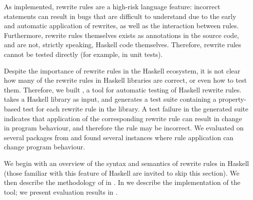 As implemented, rewrite rules are a high-risk language feature: incorrect
statements can result in bugs that are difficult to understand due to the early
and automatic application of rewrites, as well as the interaction between rules.
Furthermore, rewrite rules themselves exists as annotations in the source code,
and are not, strictly speaking, Haskell code themselves. Therefore, rewrite
rules cannot be tested directly (for example, in unit tests).

Despite the importance of rewrite rules in the Haskell ecosystem, it is not
clear how many of the rewrite rules in Haskell libraries are correct, or even
how to test them. Therefore, we built \Rulecheck, a tool for automatic testing
of Haskell rewrite rules. \Rulecheck takes a Haskell library as input, and
generates a test suite containing a property-based test for each rewrite rule in
the library. A test failure in the generated suite indicates that application of
the corresponding rewrite rule can result in change in program behaviour, and
therefore the rule may be incorrect. We evaluated \Rulecheck on several packages
from \Hackage and found several instances where rule application can change
program behaviour.

We begin with an overview of the syntax and semantics of rewrite rules in
Haskell  (those familiar with this feature of Haskell are
invited to skip this section). We then describe the methodology of \Rulecheck in
. In  we describe the implementation
of the tool; we present evaluation results in .

